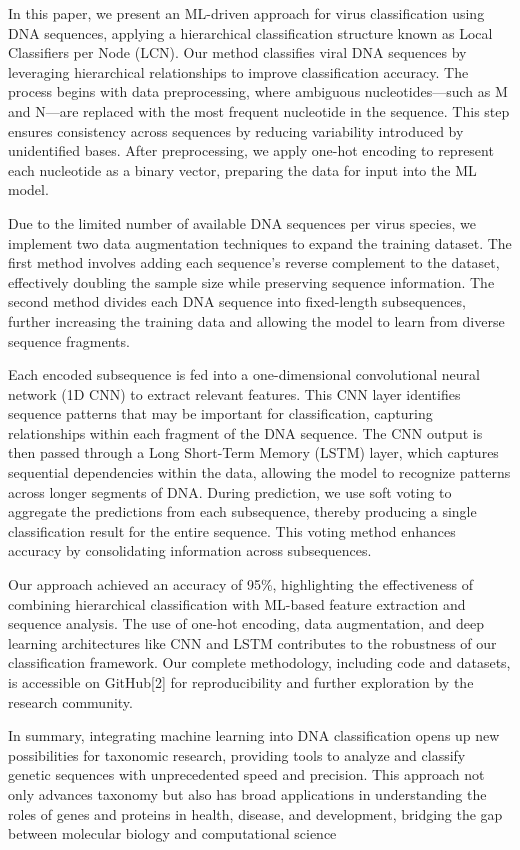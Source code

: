 In this paper, we present an ML-driven approach for virus classification using DNA sequences, applying a hierarchical classification structure known as Local Classifiers per Node (LCN). Our method classifies viral DNA sequences by leveraging hierarchical relationships to improve classification accuracy. The process begins with data preprocessing, where ambiguous nucleotides—such as M and N—are replaced with the most frequent nucleotide in the sequence. This step ensures consistency across sequences by reducing variability introduced by unidentified bases. After preprocessing, we apply one-hot encoding to represent each nucleotide as a binary vector, preparing the data for input into the ML model.

Due to the limited number of available DNA sequences per virus species, we implement two data augmentation techniques to expand the training dataset. The first method involves adding each sequence's reverse complement to the dataset, effectively doubling the sample size while preserving sequence information. The second method divides each DNA sequence into fixed-length subsequences, further increasing the training data and allowing the model to learn from diverse sequence fragments.

Each encoded subsequence is fed into a one-dimensional convolutional neural network (1D CNN) to extract relevant features. This CNN layer identifies sequence patterns that may be important for classification, capturing relationships within each fragment of the DNA sequence. The CNN output is then passed through a Long Short-Term Memory (LSTM) layer, which captures sequential dependencies within the data, allowing the model to recognize patterns across longer segments of DNA. During prediction, we use soft voting to aggregate the predictions from each subsequence, thereby producing a single classification result for the entire sequence. This voting method enhances accuracy by consolidating information across subsequences.

Our approach achieved an accuracy of 95\%, highlighting the effectiveness of combining hierarchical classification with ML-based feature extraction and sequence analysis. The use of one-hot encoding, data augmentation, and deep learning architectures like CNN and LSTM contributes to the robustness of our classification framework. Our complete methodology, including code and datasets, is accessible on GitHub[2] for reproducibility and further exploration by the research community.

In summary, integrating machine learning into DNA classification opens up new possibilities for taxonomic research, providing tools to analyze and classify genetic sequences with unprecedented speed and precision. This approach not only advances taxonomy but also has broad applications in understanding the roles of genes and proteins in health, disease, and development, bridging the gap between molecular biology and computational science